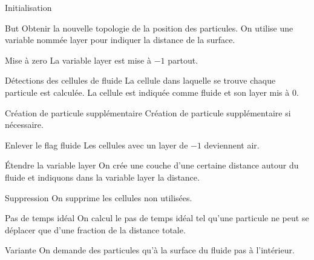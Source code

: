\begin{frame}[<+->][shrink]{Initialisation}
 
 \begin{block}{But}
  Obtenir la nouvelle topologie de la position des particules.
  On utilise une variable  nommée layer pour indiquer la distance de la surface.
 \end{block}
 \begin{block}{Mise à zero}
  La variable layer est mise à $-1$ partout.
 \end{block}
 
 \begin{block}{Détections des cellules de fluide}
  La cellule dans laquelle se trouve chaque particule est calculée. La cellule est indiquée comme fluide et son layer mis à $0$.
 \end{block}
 
  \begin{block}{Création de particule supplémentaire}
  Création de particule supplémentaire si nécessaire.
 \end{block}
 
 \begin{block}{Enlever le flag fluide}
  Les cellules avec un layer de $-1$ deviennent air.
 \end{block}
 
 \begin{block}{Étendre la variable layer}
  On crée une couche d'une certaine distance autour du fluide et indiquons dans la variable layer la distance.
 \end{block}

 \begin{block}{Suppression}
  On supprime les cellules non utilisées.
 \end{block}

 \begin{block}{Pas de temps idéal}
  On calcul le pas de temps idéal tel qu'une particule ne peut se déplacer que d'une fraction de la distance totale.
 \end{block}
\begin{block}{Variante}
 On demande des particules qu'à la surface du fluide pas à l'intérieur.
\end{block}


\end{frame}



